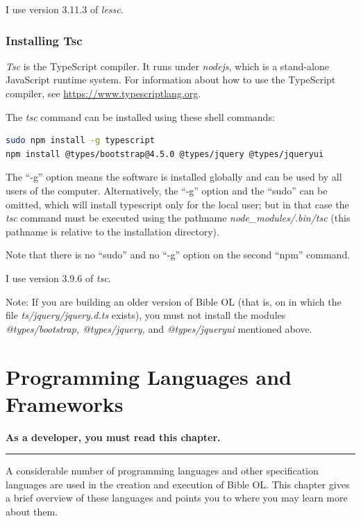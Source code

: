 \documentclass[11pt,oneside,a4paper]{memoir}
\begin{document}
I use version 3.11.3 of \emph{lessc}.

\subsection{Installing Tsc}\label{sec-installing-tsc}\label{sec-install-end}
 
\emph{Tsc} is the TypeScript compiler. It
runs under \emph{nodejs}, which is a stand-alone JavaScript runtime
system. For information about how to use the TypeScript compiler, see
\url{https://www.typescriptlang.org}.

The \emph{tsc} command can be installed using these shell commands:
 
\begin{lstlisting}[language=bash]
sudo npm install -g typescript
npm install @types/bootstrap@4.5.0 @types/jquery @types/jqueryui
\end{lstlisting}

The ``-g'' option means the software is installed globally and can be used by all users of the
computer. Alternatively, the ``-g'' option and the ``sudo'' can be omitted, which will install
typescript only for the local user; but in that case the \emph{tsc} command must be executed using
the pathname \mbox{\emph{node\_modules/.bin/tsc}} (this pathname is relative to the installation directory).

Note that there is no ``sudo'' and no ``-g'' option on the second ``npm'' command.

I use version 3.9.6 of \emph{tsc}.

Note: If you are building an older version of Bible OL (that is, on in which the file
\mbox{\emph{ts/jquery/jquery.d.ts}} exists), you must not install the modules \emph{@types/bootstrap,
  @types/jquery,} and \emph{@types/jqueryui} mentioned above.


\chapter{Programming Languages and Frameworks}\label{chap-proglang}

\textbf{As a developer, you must read this chapter.}
\plainbreak{3}

A considerable number of programming languages and other specification languages are used in the
creation and execution of Bible OL. This chapter gives a brief overview of these languages and
points you to where you may learn more about them.
\end{document}
